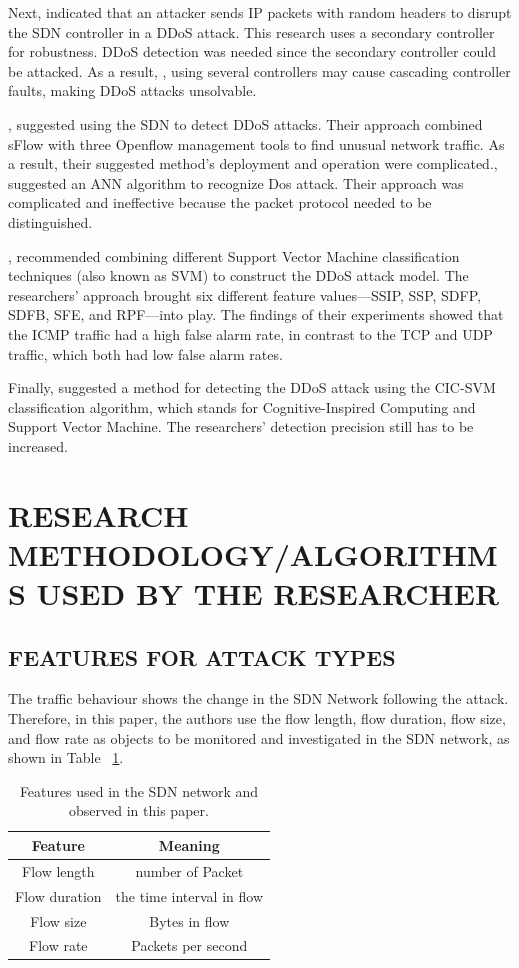 \documentclass[12pt]{report}
\begin{document}
Next, \cite{Fonseca} indicated that an attacker sends IP packets with random headers to disrupt the SDN controller in a DDoS attack. This research uses a secondary controller for robustness. DDoS detection was needed since the secondary controller could be attacked. As a result, \cite{Yao}, using several controllers may cause cascading controller faults, making DDoS attacks unsolvable.

\cite{Lin}, suggested using the SDN to detect DDoS attacks. Their approach combined sFlow with three Openflow management tools to find unusual network traffic. As a result, their suggested method's deployment and operation were complicated.\cite{Saied}, suggested an ANN algorithm to recognize Dos attack. Their approach was complicated and ineffective because the packet protocol needed to be distinguished.

\cite{Ye}, recommended combining different Support Vector Machine classification techniques (also known as SVM) to construct the DDoS attack model. The researchers’ approach brought six different feature values—SSIP, SSP, SDFP, SDFB, SFE, and RPF—into play. The findings of their experiments showed that the ICMP traffic had a high false alarm rate, in contrast to the TCP and UDP traffic, which both had low false alarm rates.

Finally, \cite{Cui} suggested a method for detecting the DDoS attack using the CIC-SVM classification algorithm, which stands for Cognitive-Inspired Computing and Support Vector Machine. The researchers’ detection precision still has to be increased.  


\section{RESEARCH METHODOLOGY/ALGORITHMS USED BY THE RESEARCHER}

\subsection{FEATURES FOR ATTACK TYPES}

The traffic behaviour shows the change in the SDN Network following the attack. Therefore, in this paper, the authors use the flow length, flow duration, flow size, and flow rate as objects to be monitored and investigated in the SDN network, as shown in Table ~\ref{tab:featurestable}.\\

\begin{table}[H]
    \centering
    \begin{tabular}{c c}
    \toprule
    Feature & Meaning \\
    \midrule
    Flow length & number of Packet \\
    Flow duration & the time interval in flow \\
    Flow size & Bytes in flow \\
    Flow rate & Packets per second \\
    \bottomrule
    \end{tabular}
    \caption{Features used in the SDN network and observed in this paper.}
    \label{tab:featurestable}
\end{table}
\end{document}
